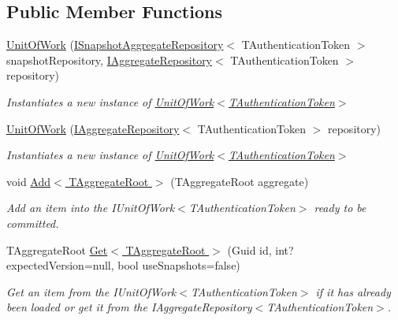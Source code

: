 \subsection*{Public Member Functions}
\begin{DoxyCompactItemize}
\item 
\hyperlink{classCqrs_1_1Domain_1_1UnitOfWork_a9ec92dbd580f3885f7cf5a9ad360e1ac_a9ec92dbd580f3885f7cf5a9ad360e1ac}{Unit\+Of\+Work} (\hyperlink{interfaceCqrs_1_1Domain_1_1ISnapshotAggregateRepository}{I\+Snapshot\+Aggregate\+Repository}$<$ T\+Authentication\+Token $>$ snapshot\+Repository, \hyperlink{interfaceCqrs_1_1Domain_1_1IAggregateRepository}{I\+Aggregate\+Repository}$<$ T\+Authentication\+Token $>$ repository)
\begin{DoxyCompactList}\small\item\em Instantiates a new instance of \hyperlink{classCqrs_1_1Domain_1_1UnitOfWork_a9ec92dbd580f3885f7cf5a9ad360e1ac_a9ec92dbd580f3885f7cf5a9ad360e1ac}{Unit\+Of\+Work$<$\+T\+Authentication\+Token$>$} \end{DoxyCompactList}\item 
\hyperlink{classCqrs_1_1Domain_1_1UnitOfWork_a717facda044d5025e9d7abdec4f54acd_a717facda044d5025e9d7abdec4f54acd}{Unit\+Of\+Work} (\hyperlink{interfaceCqrs_1_1Domain_1_1IAggregateRepository}{I\+Aggregate\+Repository}$<$ T\+Authentication\+Token $>$ repository)
\begin{DoxyCompactList}\small\item\em Instantiates a new instance of \hyperlink{classCqrs_1_1Domain_1_1UnitOfWork_a9ec92dbd580f3885f7cf5a9ad360e1ac_a9ec92dbd580f3885f7cf5a9ad360e1ac}{Unit\+Of\+Work$<$\+T\+Authentication\+Token$>$} \end{DoxyCompactList}\item 
void \hyperlink{classCqrs_1_1Domain_1_1UnitOfWork_a840214f97d3661c7b5a739df65fadc9f_a840214f97d3661c7b5a739df65fadc9f}{Add$<$ T\+Aggregate\+Root $>$} (T\+Aggregate\+Root aggregate)
\begin{DoxyCompactList}\small\item\em Add an item into the I\+Unit\+Of\+Work$<$\+T\+Authentication\+Token$>$ ready to be committed. \end{DoxyCompactList}\item 
T\+Aggregate\+Root \hyperlink{classCqrs_1_1Domain_1_1UnitOfWork_a0592865d52ba0eafb9a5ad1fbdad9729_a0592865d52ba0eafb9a5ad1fbdad9729}{Get$<$ T\+Aggregate\+Root $>$} (Guid id, int? expected\+Version=null, bool use\+Snapshots=false)
\begin{DoxyCompactList}\small\item\em Get an item from the I\+Unit\+Of\+Work$<$\+T\+Authentication\+Token$>$ if it has already been loaded or get it from the I\+Aggregate\+Repository$<$\+T\+Authentication\+Token$>$. \end{DoxyCompactList}\item 

\end{DoxyCompactItemize}
